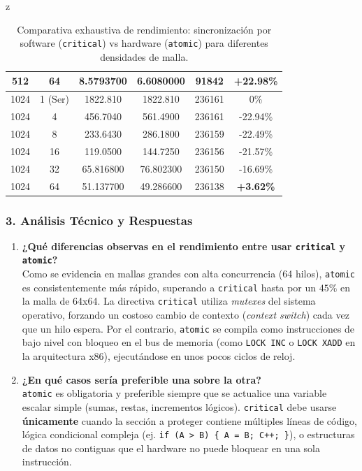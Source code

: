 z\documentclass[11pt,a4paper]{article}
\begin{document}
\begin{table}[H]
\begin{tabular}{|c|c|c|c|c|c|}
512 & 64 & 8.5793700 & 6.6080000 & 91842 & \textbf{+22.98\%} \\ \hline
1024 & 1 (Ser) & 1822.810 & 1822.810 & 236161 & 0\% \\ 
1024 & 4 & 456.7040 & 561.4900 & 236161 & -22.94\% \\ 
1024 & 8 & 233.6430 & 286.1800 & 236159 & -22.49\% \\ 
1024 & 16 & 119.0500 & 144.7250 & 236156 & -21.57\% \\ 
1024 & 32 & 65.816800 & 76.802300 & 236150 & -16.69\% \\ 
1024 & 64 & 51.137700 & 49.286600 & 236138 & \textbf{+3.62\%} \\ \hline
\end{tabular}
\caption{Comparativa exhaustiva de rendimiento: sincronización por software (\texttt{critical}) vs hardware (\texttt{atomic}) para diferentes densidades de malla.}
\label{tab:resultados_completos_sincronizacion}
\end{table}

\subsubsection*{3. Análisis Técnico y Respuestas}

\begin{enumerate}
    \item \textbf{¿Qué diferencias observas en el rendimiento entre usar \texttt{critical} y \texttt{atomic}?} \\
    Como se evidencia en mallas grandes con alta concurrencia (64 hilos), \texttt{atomic} es consistentemente más rápido, superando a \texttt{critical} hasta por un $45\%$ en la malla de 64x64. La directiva \texttt{critical} utiliza \textit{mutexes} del sistema operativo, forzando un costoso cambio de contexto (\textit{context switch}) cada vez que un hilo espera. Por el contrario, \texttt{atomic} se compila como instrucciones de bajo nivel con bloqueo en el bus de memoria (como \texttt{LOCK INC} o \texttt{LOCK XADD} en la arquitectura x86), ejecutándose en unos pocos ciclos de reloj.

    \item \textbf{¿En qué casos sería preferible una sobre la otra?} \\
    \texttt{atomic} es obligatoria y preferible siempre que se actualice una variable escalar simple (sumas, restas, incrementos lógicos). \texttt{critical} debe usarse \textbf{únicamente} cuando la sección a proteger contiene múltiples líneas de código, lógica condicional compleja (ej. \texttt{if (A > B) \{ A = B; C++; \}}), o estructuras de datos no contiguas que el hardware no puede bloquear en una sola instrucción.
\end{enumerate}
\end{document}
